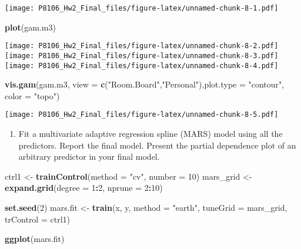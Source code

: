 \documentclass[]{article}
\newenvironment{Shaded}{\begin{snugshade}}{\end{snugshade}}
\newcommand{\DataTypeTok}[1]{\textcolor[rgb]{0.13,0.29,0.53}{#1}}
\newcommand{\DecValTok}[1]{\textcolor[rgb]{0.00,0.00,0.81}{#1}}
\newcommand{\KeywordTok}[1]{\textcolor[rgb]{0.13,0.29,0.53}{\textbf{#1}}}
\newcommand{\NormalTok}[1]{#1}
\newcommand{\OperatorTok}[1]{\textcolor[rgb]{0.81,0.36,0.00}{\textbf{#1}}}
\newcommand{\StringTok}[1]{\textcolor[rgb]{0.31,0.60,0.02}{#1}}
\providecommand{\tightlist}{%
  \setlength{\itemsep}{0pt}\setlength{\parskip}{0pt}}
\begin{document}
\texttt{[image: P8106\_Hw2\_Final\_files/figure-latex/unnamed-chunk-8-1.pdf]}

\begin{Shaded}
\begin{Highlighting}[]
\KeywordTok{plot}\NormalTok{(gam.m3)}
\end{Highlighting}
\end{Shaded}

\texttt{[image: P8106\_Hw2\_Final\_files/figure-latex/unnamed-chunk-8-2.pdf]}
\texttt{[image: P8106\_Hw2\_Final\_files/figure-latex/unnamed-chunk-8-3.pdf]}
\texttt{[image: P8106\_Hw2\_Final\_files/figure-latex/unnamed-chunk-8-4.pdf]}

\begin{Shaded}
\begin{Highlighting}[]
\KeywordTok{vis.gam}\NormalTok{(gam.m3, }\DataTypeTok{view =} \KeywordTok{c}\NormalTok{(}\StringTok{"Room.Board"}\NormalTok{,}\StringTok{"Personal"}\NormalTok{),}\DataTypeTok{plot.type =} \StringTok{"contour"}\NormalTok{, }\DataTypeTok{color =} \StringTok{"topo"}\NormalTok{)}
\end{Highlighting}
\end{Shaded}

\texttt{[image: P8106\_Hw2\_Final\_files/figure-latex/unnamed-chunk-8-5.pdf]}

\begin{enumerate}
\def\labelenumi{(\alph{enumi})}
\setcounter{enumi}{3}
\tightlist
\item
  Fit a multivariate adaptive regression spline (MARS) model using all
  the predictors. Report the final model. Present the partial dependence
  plot of an arbitrary predictor in your final model.
\end{enumerate}

\begin{Shaded}
\begin{Highlighting}[]
\NormalTok{ctrl1 <-}\StringTok{ }\KeywordTok{trainControl}\NormalTok{(}\DataTypeTok{method =} \StringTok{"cv"}\NormalTok{, }\DataTypeTok{number =} \DecValTok{10}\NormalTok{)}
\NormalTok{mars_grid <-}\StringTok{ }\KeywordTok{expand.grid}\NormalTok{(}\DataTypeTok{degree =} \DecValTok{1}\OperatorTok{:}\DecValTok{2}\NormalTok{, }
                         \DataTypeTok{nprune =} \DecValTok{2}\OperatorTok{:}\DecValTok{10}\NormalTok{)}

\KeywordTok{set.seed}\NormalTok{(}\DecValTok{2}\NormalTok{)}
\NormalTok{mars.fit <-}\StringTok{ }\KeywordTok{train}\NormalTok{(x, y,}
                  \DataTypeTok{method =} \StringTok{"earth"}\NormalTok{,}
                  \DataTypeTok{tuneGrid =}\NormalTok{ mars_grid,}
                  \DataTypeTok{trControl =}\NormalTok{ ctrl1)}

\KeywordTok{ggplot}\NormalTok{(mars.fit)}
\end{Highlighting}
\end{Shaded}
\end{document}
